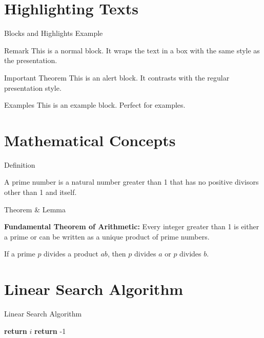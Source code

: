 \documentclass[10pt]{beamer}
\theoremstyle{definition}
\begin{document}
	\section{Highlighting Texts}
	\begin{frame}{Blocks and Highlights Example}
		\begin{block}{Remark}
			This is a normal block. It wraps the text in a box with the same style as the presentation.
		\end{block}
		
		\begin{alertblock}{Important Theorem}
			This is an alert block. It contrasts with the regular presentation style.
		\end{alertblock}
		
		\begin{exampleblock}{Examples}
			This is an example block. Perfect for examples.
		\end{exampleblock}
	\end{frame}
	
	\section{Mathematical Concepts}
	\begin{frame}{Definition}
		\begin{definition}
			A prime number is a natural number greater than 1 that has no positive divisors other than 1 and itself.
		\end{definition}
	\end{frame}
	
	\begin{frame}{Theorem \& Lemma}
		\begin{theorem}
			\textbf{Fundamental Theorem of Arithmetic:} Every integer greater than 1 is either a prime or can be written as a unique product of prime numbers.
		\end{theorem}
		\begin{lemma}
			If a prime $p$ divides a product $ab$, then $p$ divides $a$ or $p$ divides $b$.
		\end{lemma}
	\end{frame}
	
	\section{Linear Search Algorithm}
	\begin{frame}{Linear Search Algorithm}
		\begin{algorithm}[H]
			\caption{Linear Search}
			\begin{algorithmic}[1]
				\State \textbf{return} $i$
				\EndIf
				\EndFor
				\State \textbf{return} -1
				\EndProcedure
			\end{algorithmic}
		\end{algorithm}
	\end{frame}
	
\end{document}

